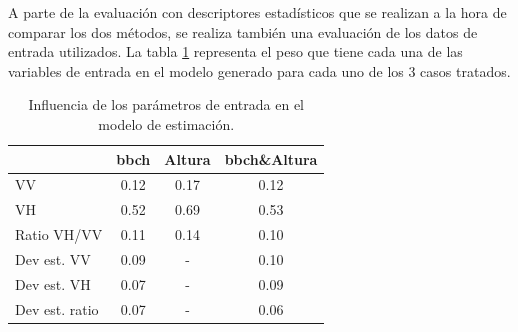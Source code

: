 \par A parte de la evaluación con descriptores estadísticos que se realizan a la hora de comparar los dos métodos, se realiza también una evaluación de los datos de entrada utilizados. La tabla \ref{tab:imp_f} representa el peso que tiene cada una de las variables de entrada en el modelo generado para cada uno de los 3 casos tratados. 
\\
\begin{table}[h] 
\centering
\begin{tabular}{l|ccc}
               & \gls{bbch} & Altura & \gls{bbch}\&Altura \\ \hline \hline
VV             & 0.12 & 0.17   & 0.12         \\
VH             & 0.52 & 0.69   & 0.53         \\
Ratio VH/VV    & 0.11 & 0.14   & 0.10         \\
Dev est. VV    & 0.09 & -   & 0.10         \\
Dev est. VH    & 0.07 & -   & 0.09         \\
Dev est. ratio & 0.07 & -   & 0.06        
\end{tabular}
\caption{Influencia de los parámetros de entrada en el modelo de estimación.\label{tab:imp_f}}
\end{table}

